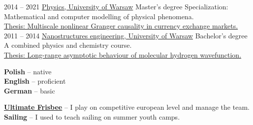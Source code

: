 \documentclass[10pt]{developercv} %
\begin{document}

\begin{entrylist}
	\entry
		{2014 -- 2021}
		{\href{https://www.fuw.edu.pl/}{Physics, University of Warsaw}}
		{Master's degree}
		{Specialization: Mathematical and computer modelling of physical phenomena.\\
		\href{https://github.com/marcinkruk/mgr/blob/master/mkruk-thesis-20210915.pdf}{Thesis: Multiscale nonlinear Granger causality in currency exchange markets.}}
	\entry
		{2011 -- 2014}
		{\href{https://www.fuw.edu.pl/}{Nanostructures engineering, University of Warsaw}}
		{Bachelor's degree}
		{A combined physics and chemistry course.\\
		\href{https://github.com/marcinkruk/mgr/blob/master/lic/mkruk-lic.pdf}{Thesis: Long-range asymptotic behaviour of molecular hydrogen wavefunction.}}
\end{entrylist}


\begin{minipage}[t]{0.23\textwidth}
	\vspace{-\baselineskip} %

	
	\textbf{Polish} -- native\\
	\textbf{English} -- proficient\\
	\textbf{German} -- basic
\end{minipage}
\begin{minipage}[t]{0.75\textwidth}
	\vspace{-\baselineskip} %
	
	
	\textbf{\href{https://www.facebook.com/AKSZlyKosmodysk}{Ultimate Frisbee}} -- I play on competitive european level and manage the team.\\
	\textbf{Sailing} -- I used to teach sailing on summer youth camps.
\end{minipage}
\hfill

\end{document}
